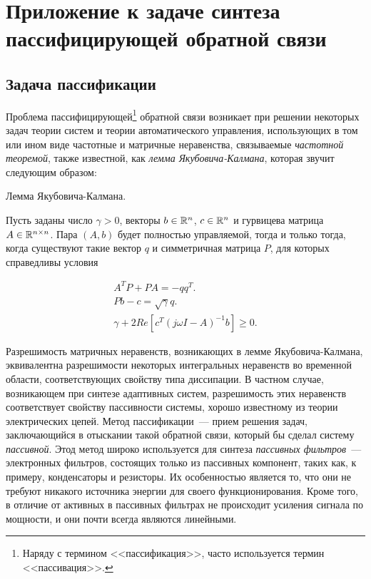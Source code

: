 \chapter[Приложение к задаче пассификации]{Приложение к задаче синтеза пассифицирующей обратной связи}

\section{Задача пассификации}

Проблема пассифицирующей\footnote{Наряду с термином <<пассификация>>, часто используется термин <<пассивация>>.} обратной связи возникает при решении некоторых задач теории систем и теории автоматического управления, использующих в том или ином виде частотные и матричные неравенства, связываемые \emph{частотной теоремой}, также известной, как \emph{лемма Якубовича-Калмана}, которая звучит следующим образом:

\begin{lemma}
\label{lemma:5/1}
Лемма Якубовича-Калмана.\br

Пусть заданы число $\gamma > 0$, векторы $b \in \mathbb{R}^{n}$, $c \in \mathbb{R}^{n}$ и гурвицева матрица $A \in \mathbb{R}^{n \times n}$. Пара $(A,b)$ будет полностью управляемой, тогда и только тогда, когда существуют такие вектор $q$ и симметричная матрица $P$, для которых справедливы условия

\begin{eqnarray*}
A^TP+PA = -qq^T\mbox{.} \\
Pb-c = \sqrt{\gamma}q\mbox{.} \\
\gamma + 2Re[ c^T (j\omega I - A)^{-1} b] \geqslant 0\mbox{.}
\end{eqnarray*}

\end{lemma}

Разрешимость матричных неравенств, возникающих в лемме Яку\-бо\-ви\-ча-Калмана, эквивалентна разрешимости некоторых интегральных неравенств во временной области, соответствующих свойству типа диссипации. В частном случае, возникающем при синтезе адаптивных систем, разрешимость этих неравенств соответствует свойству пассивности системы, хорошо известному из теории электрических цепей. Метод пассификации~--- прием решения задач, заключающийся в отыскании такой обратной связи, который бы сделал систему \emph{пассивной}. Этод метод широко используется для синтеза \emph{пассивных фильтров}~--- электронных фильтров, состоящих только из пассивных компонент, таких как, к примеру, конденсаторы и резисторы. Их особенностью является то, что они не требуют никакого источника энергии для своего функционирования. Кроме того, в отличие от активных в пассивных фильтрах не происходит усиления сигнала по мощности, и они почти всегда являются линейными.\br

